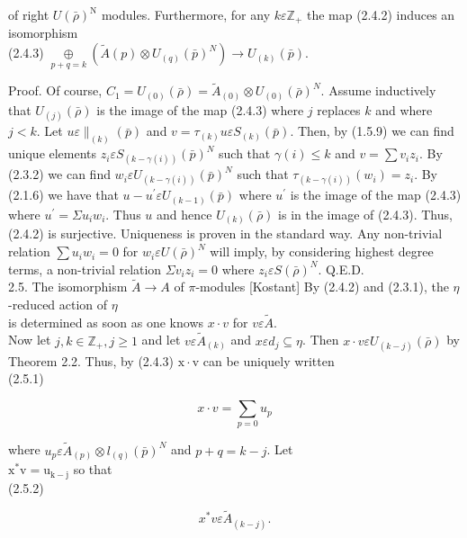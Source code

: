 \documentclass[10pt]{article}
\begin{document}
of right $U(\bar{\rho})^{\mathrm{N}}$ modules. Furthermore, for any $k \varepsilon \mathbb{Z}_{+}$ the map (2.4.2) induces an isomorphism\\
(2.4.3) $\underset{p+q=k}{\oplus}\left(\tilde{A}(p) \otimes U_{(q)}(\bar{p})^{N}\right) \rightarrow U_{(k)}(\bar{p})$.

Proof. Of course, $C_{1}=U_{(0)}(\bar{\rho})=\tilde{A}_{(0)} \otimes U_{(0)}(\bar{\rho})^{N}$. Assume inductively that $U_{(j)}(\bar{\rho})$ is the image of the map (2.4.3) where $j$ replaces $k$ and where $j<k$. Let $u \varepsilon \|_{(k)}(\bar{p})$ and $v=\tau_{(k)} u \varepsilon S_{(k)}(\bar{p})$. Then, by (1.5.9) we can find unique elements $z_{i} \varepsilon S_{(k-\gamma(i))}(\bar{p})^{N}$ such that $\gamma(i) \leq k$ and $v=\sum v_{i} z_{i}$. By (2.3.2) we can find $w_{i} \varepsilon U_{(k-\gamma(i))}(\bar{p})^{N}$ such that $\tau_{(k-\gamma(i))}\left(w_{i}\right)=z_{i}$. By (2.1.6) we have that $u-u^{\prime} \varepsilon U_{(k-1)}(\bar{p})$ where $u^{\prime}$ is the image of the map (2.4.3) where $u^{\prime}=\Sigma u_{i} w_{i}$. Thus $u$ and hence $U_{(k)}(\bar{\rho})$ is in the image of (2.4.3). Thus, (2.4.2) is surjective. Uniqueness is proven in the standard way. Any non-trivial relation $\sum u_{i} w_{i}=0$ for $w_{i} \varepsilon U(\bar{\rho})^{N}$ will imply, by considering highest degree terms, a non-trivial relation $\Sigma v_{i} z_{i}=0$ where $z_{i} \varepsilon S(\bar{\rho})^{N}$. Q.E.D.\\
2.5. The isomorphism $\tilde{A} \rightarrow A$ of $\pi$-modules [Kostant] By (2.4.2) and (2.3.1), the $\eta$-reduced action of $\eta$\\
is determined as soon as one knows $x \cdot v$ for $v \varepsilon \tilde{A}$.\\
Now let $j, k \in \mathbb{Z}_{+}, j \geq 1$ and let $v \varepsilon \tilde{A}_{(k)}$ and $x \varepsilon d_{j} \subseteq \eta$. Then $x \cdot v \varepsilon U_{(k-j)}(\bar{\rho})$ by Theorem 2.2. Thus, by (2.4.3) $\mathrm{x} \cdot \mathrm{v}$ can be uniquely written\\
(2.5.1)

$$
x \cdot v=\sum_{p=0} u_{p}
$$

where $u_{p} \varepsilon \tilde{A}_{(p)} \otimes l_{(q)}(\bar{p})^{N}$ and $p+q=k-j$. Let\\
$\mathrm{x}^{*} \mathrm{v}=\mathrm{u}_{\mathrm{k}-\mathrm{j}}$ so that\\
(2.5.2)

$$
x^{*} v \varepsilon \tilde{A}_{(k-j)} .
$$
\end{document}
